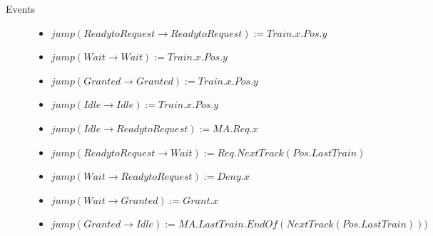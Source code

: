 \begin{mydef}
\begin{description}
\begin{itemize}
	\end{itemize}

\item[Events] \hspace*{0mm}
\begin{itemize}
\item $jump(Ready to Request \to Ready to Request) := Train.x.Pos.y$
	\item $jump(Wait \to Wait) := Train.x.Pos.y$
	\item $jump(Granted \to Granted) := Train.x.Pos.y $
         \item $jump(Idle \to Idle) := Train.x.Pos.y$
	\item $jump(Idle \to Ready to Request) := MA.Req.x $
	\item $jump(Ready to Request \to Wait) := Req.NextTrack(Pos.LastTrain)$
	\item $jump(Wait \to Ready to Request) := Deny.x$
	\item $jump(Wait \to Granted) := Grant.x$
	\item $jump(Granted \to Idle) := MA.LastTrain.EndOf(NextTrack(Pos.LastTrain)))$
\end{itemize}

\end{description}

\end{mydef}



